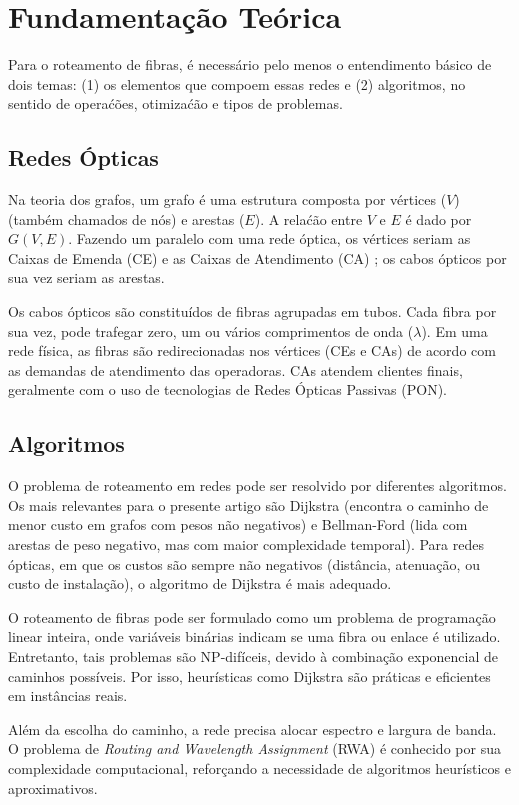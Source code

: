 \section{Fundamentação Teórica} \label{sec:fundaments}

Para o roteamento de fibras, é necessário pelo menos o entendimento básico de 
dois temas: (1) os elementos que compoem essas redes e (2) algoritmos, no sentido
de operaćões, otimizaćão e tipos de problemas.

\subsection{Redes Ópticas}

Na teoria dos grafos, um grafo é uma estrutura composta por vértices ($V$)
(também chamados de nós) e arestas ($E$). A relaćão entre $V$ e $E$ é dado por
$G(V,E)$. Fazendo um paralelo com uma rede óptica, os vértices seriam as Caixas
de Emenda (CE) e as Caixas de Atendimento (CA) \cite{maeda2009optical}; os
cabos ópticos por sua vez seriam as arestas.

Os cabos ópticos são constituídos de fibras agrupadas em tubos. Cada fibra por
sua vez, pode trafegar zero, um ou vários comprimentos de onda ($\lambda$).
Em uma rede física, as fibras são redirecionadas nos vértices (CEs e CAs) de
acordo com as demandas de atendimento das operadoras. CAs atendem clientes finais,
geralmente com o uso de tecnologias de Redes Ópticas Passivas (PON).

\subsection{Algoritmos}
O problema de roteamento em redes pode ser resolvido por diferentes algoritmos.
Os mais relevantes para o presente artigo são Dijkstra (encontra o caminho de
menor custo em grafos com pesos não negativos) \cite{dijkstra2022note} e
Bellman-Ford (lida com arestas de peso negativo, mas com maior complexidade
temporal). Para redes ópticas, em que os custos são sempre não negativos
(distância, atenuação, ou custo de instalação), o algoritmo de Dijkstra é mais
adequado.

O roteamento de fibras pode ser formulado como um problema de programação
linear inteira, onde variáveis binárias indicam se uma fibra ou enlace é
utilizado. Entretanto, tais problemas são NP-difíceis, devido à combinação
exponencial de caminhos possíveis. Por isso, heurísticas como Dijkstra são
práticas e eficientes em instâncias reais.

Além da escolha do caminho, a rede precisa alocar espectro e largura de banda.
O problema de \textit{Routing and Wavelength Assignment} (RWA) é conhecido por
sua complexidade computacional, reforçando a necessidade de algoritmos
heurísticos e aproximativos.
